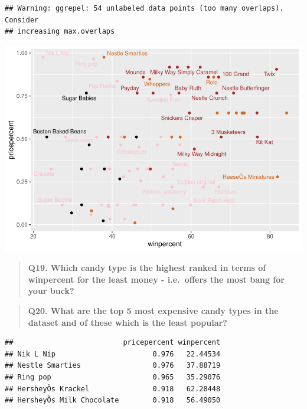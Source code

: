 \documentclass[
]{article}
\newenvironment{Shaded}{\begin{snugshade}}{\end{snugshade}}
\newcommand{\AttributeTok}[1]{\textcolor[rgb]{0.77,0.63,0.00}{#1}}
\newcommand{\ConstantTok}[1]{\textcolor[rgb]{0.00,0.00,0.00}{#1}}
\newcommand{\DecValTok}[1]{\textcolor[rgb]{0.00,0.00,0.81}{#1}}
\newcommand{\FunctionTok}[1]{\textcolor[rgb]{0.00,0.00,0.00}{#1}}
\newcommand{\NormalTok}[1]{#1}
\newcommand{\OtherTok}[1]{\textcolor[rgb]{0.56,0.35,0.01}{#1}}
\newcommand{\SpecialCharTok}[1]{\textcolor[rgb]{0.00,0.00,0.00}{#1}}
\begin{document}
\begin{verbatim}
## Warning: ggrepel: 54 unlabeled data points (too many overlaps). Consider
## increasing max.overlaps
\end{verbatim}

\includegraphics{Class-10-Halloween-Candy_files/figure-latex/unnamed-chunk-18-1.pdf}

\begin{quote}
\textbf{Q19. Which candy type is the highest ranked in terms of
winpercent for the least money - i.e.~offers the most bang for your
buck?}
\end{quote}

\begin{quote}
\textbf{Q20. What are the top 5 most expensive candy types in the
dataset and of these which is the least popular?}
\end{quote}

\begin{Shaded}
\end{Shaded}

\begin{verbatim}
##                          pricepercent winpercent
## Nik L Nip                       0.976   22.44534
## Nestle Smarties                 0.976   37.88719
## Ring pop                        0.965   35.29076
## HersheyÕs Krackel               0.918   62.28448
## HersheyÕs Milk Chocolate        0.918   56.49050
\end{verbatim}
\end{document}
